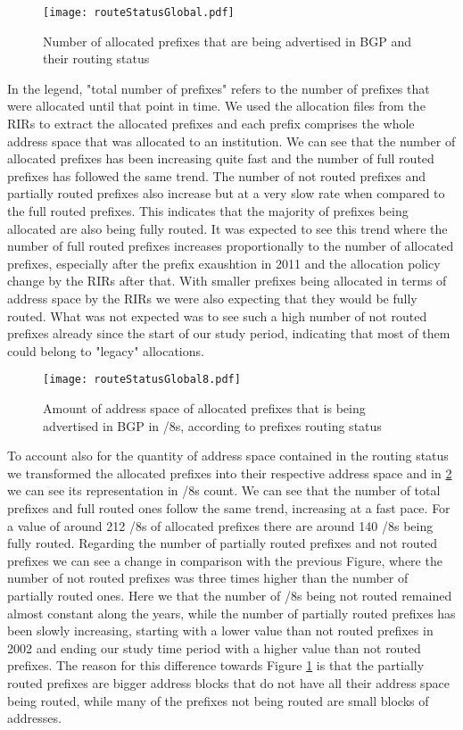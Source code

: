 \documentclass[11pt,a4paper]{scrreprt}
\begin{document}
\begin{figure}[!h]
\centering
\texttt{[image: routeStatusGlobal.pdf]}
\caption{Number of allocated prefixes that are being advertised in BGP and their routing status}
\label{fig:routingStatusGlobal}
\end{figure}

In the legend, "total number of prefixes" refers to the number of prefixes that were allocated until that point in time. We used the allocation files from the RIRs to extract the allocated prefixes and each prefix comprises the whole address space that was allocated to an institution. 
We can see that the number of allocated prefixes has been increasing quite fast and the number of full routed prefixes has followed the same trend. The number of not routed prefixes and partially routed prefixes also increase but at a very slow rate when compared to the full routed prefixes. This indicates that the majority of prefixes being allocated are also being fully routed. It was expected to see this trend where the number of full routed prefixes increases proportionally to the number of allocated prefixes, especially after the prefix exaushtion in 2011 and the allocation policy change by the RIRs after that. With smaller prefixes being allocated in terms of address space by the RIRs we were also expecting that they would be fully routed. What was not expected was to see such a high number of not routed prefixes already since the start of our study period, indicating that most of them could belong to "legacy" allocations. 

\begin{figure}[!h]
\centering
\texttt{[image: routeStatusGlobal8.pdf]}
\caption{Amount of address space of allocated prefixes that is being advertised in BGP in /8s, according to prefixes routing status}
\label{fig:routingStatusGlobal8}
\end{figure}

To account also for the quantity of address space contained in the routing status we transformed the allocated prefixes into their respective address space and in \ref{fig:routingStatusGlobal8} we can see its representation in /8s count.
We can see that the number of total prefixes and full routed ones follow the same trend, increasing at a fast pace. For a value of around 212 /8s of allocated prefixes there are around 140 /8s being fully routed. 
Regarding the number of partially routed prefixes and not routed prefixes we can see a change in comparison with the previous Figure, where the number of not routed prefixes was three times higher than the number of partially routed ones. Here we that the number of /8s being not routed remained almost constant along the years, while the number of partially routed prefixes has been slowly increasing, starting with a lower value than not routed prefixes in 2002 and ending our study time period with a higher value than not routed prefixes. The reason for this difference towards Figure \ref{fig:routingStatusGlobal} is that the partially routed prefixes are bigger address blocks that do not have all their address space being routed, while many of the prefixes not being routed are small blocks of addresses. 
\end{document}
